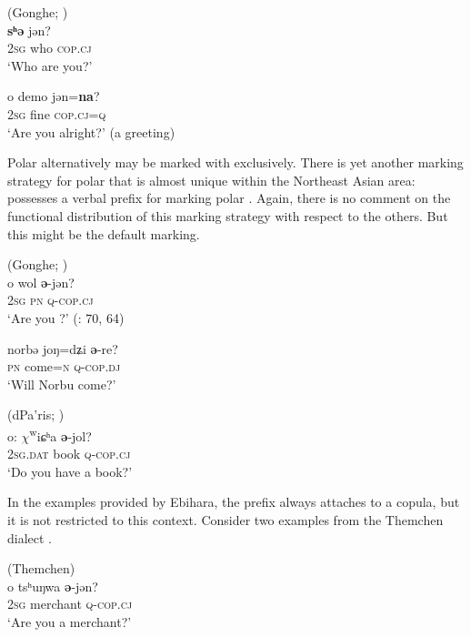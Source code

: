   
\ea%
    \label{ex:trans:33}
     (Gonghe; )\\
    \ea
     \textbf{{s}}\textbf{{ʰ}}\textbf{{ə}} {jən?}\\
    2\textsc{sg}  who  \textsc{cop.cj}\\
    \glt ‘Who are you?’
    
    \ex
    o  demo  jən=\textbf{{na}}?\\
    2\textsc{sg}  fine  \textsc{cop.cj}=\textsc{q}\\
    \glt ‘Are you alright?’ (a greeting) \citep[65]{Ebihara2011}
    \z
    \z

Polar  alternatively may be marked with  exclusively. There is yet another marking strategy for polar  that is almost unique within the Northeast Asian area:  possesses a verbal prefix for marking polar . Again, there is no comment on the functional distribution of this marking strategy with respect to the others. But this might be the default marking.

\ea%
    \label{ex:trans:34}
    \ea
     (Gonghe; )\\
    o  wol \textbf{{ə}}{-jən?}\\
    2\textsc{sg}  \textsc{pn}  \textsc{q}-\textsc{cop.cj}\\
    \glt ‘Are you ?’ (\citealt{Ebihara2011}: 70, 64)
    
    \ex
    \gll norbə  joŋ=dʑi \textbf{{ə}}{-re?}\\
    \textsc{pn}  come=\textsc{n}  \textsc{q}-\textsc{cop.dj}\\
    \glt ‘Will Norbu come?’
    \z
    \z

\ea%
    \label{ex:trans:35}
     (dPa’ris; )\\
    o:    $\chi $\textsuperscript{w}{iɕʰ}{a} \textbf{{ə}}{-jol?}\\
    2\textsc{sg.dat}  book    \textsc{q}-\textsc{cop.cj}\\
    \glt ‘Do you have a book?’ \citep[155]{Ebihara2013}
    \z

In the examples provided by Ebihara, the prefix always attaches to a copula, but it is not restricted to this context. Consider two examples from the Themchen dialect .

\ea%
    \label{ex:trans:36}
     (Themchen)\\
    \ea
    o  tsʰ{uŋwa} \textbf{{ə}}{-jən?}\\
    2\textsc{sg}  merchant  \textsc{q}-\textsc{cop.cj}\\
    \glt ‘Are you a merchant?’
    
